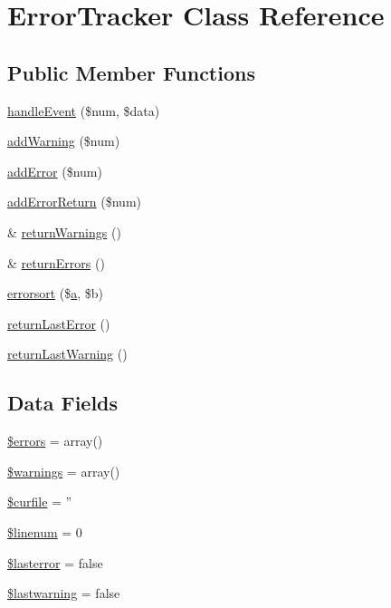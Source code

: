 \hypertarget{class_error_tracker}{\section{\-Error\-Tracker \-Class \-Reference}
\label{class_error_tracker}
}
\subsection*{\-Public \-Member \-Functions}
\begin{DoxyCompactItemize}
\item 
\hyperlink{class_error_tracker_a79c903933aea2ab2f363c94aeb74c171}{handle\-Event} (\$num, \$data)
\item 
\hyperlink{class_error_tracker_a0ed443a8eae207cb1cc1df9a377e4ab8}{add\-Warning} (\$num)
\item 
\hyperlink{class_error_tracker_a3a280f3829918777acb4ade45dc30f0c}{add\-Error} (\$num)
\item 
\hyperlink{class_error_tracker_a9345af0d3e0611560db17e1c7386c912}{add\-Error\-Return} (\$num)
\item 
\& \hyperlink{class_error_tracker_a73271fd4655a874af7741aaa8dd599ae}{return\-Warnings} ()
\item 
\& \hyperlink{class_error_tracker_a5e1b9101af2d8443601d0f7ad8f212c8}{return\-Errors} ()
\item 
\hyperlink{class_error_tracker_ad07d17ca630d76f4a595fd4c4afce74c}{errorsort} (\$\hyperlink{classa}{a}, \$b)
\item 
\hyperlink{class_error_tracker_a1e8aae47471887a441f1a6e1038b8628}{return\-Last\-Error} ()
\item 
\hyperlink{class_error_tracker_a07a71ca83f381191df99379f787e8d92}{return\-Last\-Warning} ()
\end{DoxyCompactItemize}
\subsection*{\-Data \-Fields}
\begin{DoxyCompactItemize}
\item 
\hyperlink{class_error_tracker_ab24faf4aa647cdcee494fc48524ad4ff}{\$errors} = array()
\item 
\hyperlink{class_error_tracker_a46209434b2ef1d7554dc5135de969432}{\$warnings} = array()
\item 
\hyperlink{class_error_tracker_a84352b4d740a45279b61228864b9b5e7}{\$curfile} = ''
\item 
\hyperlink{class_error_tracker_a597bef7e50a56c650cf17a1ed6bc5595}{\$linenum} = 0
\item 
\hyperlink{class_error_tracker_a23ed1c329afe91715e872afa5412dbdc}{\$lasterror} = false
\item 
\hyperlink{class_error_tracker_a51bd31003f4ad35205a62bcbff2eece9}{\$lastwarning} = false
\end{DoxyCompactItemize}


